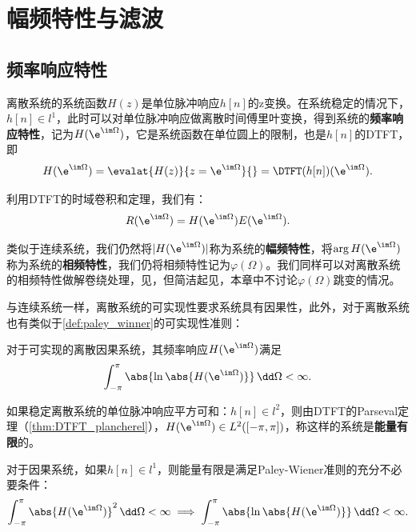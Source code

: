 \section{幅频特性与滤波}\label{sec:Magnitude_and_Filter}

\subsection{频率响应特性}\label{sub:discrete_system_freq_response}

离散系统的系统函数$H(z)$是单位脉冲响应$h[n]$的z变换。在系统稳定的情况下，$h[n]\in l^1$，此时可以对单位脉冲响应做离散时间傅里叶变换，得到系统的\textbf{频率响应特性}，记为$H(\e^{\im\Omega})$，它是系统函数在单位圆上的限制，也是$h[n]$的DTFT，即
\begin{equation}
    H(\e^{\im\Omega})=\evalat{H(z)}{z=\e^{\im\Omega}}{}=\DTFT(h[n])(\e^{\im\Omega}).
\end{equation}

利用DTFT的时域卷积和定理，我们有：
\begin{equation}
    R(\e^{\im\Omega})=H(\e^{\im\Omega})E(\e^{\im\Omega}).
\end{equation}

类似于连续系统，我们仍然将$|H(\e^{\im\Omega})|$称为系统的\textbf{幅频特性}，将$\arg H(\e^{\im\Omega})$称为系统的\textbf{相频特性}，我们仍将相频特性记为$\varphi(\Omega)$。我们同样可以对离散系统的相频特性做解卷绕处理，见，但简洁起见，本章中不讨论$\varphi(\Omega)$跳变的情况。

与连续系统一样，离散系统的可实现性要求系统具有因果性，此外，对于离散系统也有类似于\cref{def:paley_winner}的可实现性准则：

\begin{definition}
    对于可实现的离散因果系统，其频率响应$H(\e^{\im\Omega})$满足
    \begin{equation}
        \int_{-\pi}^{\pi}\abs{\ln\abs{H(\e^{\im\Omega})}}\,\dd\Omega<\infty.
    \end{equation}
\end{definition}

\begin{definition}[离散能量有限系统]
    如果稳定离散系统的单位脉冲响应平方可和：$h[n]\in l^2$，则由DTFT的Parseval定理（\cref{thm:DTFT_plancherel}），$H(\e^{\im\Omega})\in L^2([-\pi,\pi])$，称这样的系统是\textbf{能量有限}的。
\end{definition}

\begin{claim}
    对于因果系统，如果$h[n]\in l^1$，则能量有限是满足Paley-Wiener准则的充分不必要条件：
    \begin{equation}
        \int_{-\pi}^{\pi}\abs{H(\e^{\im\Omega})}^2\,\dd\Omega<\infty\implies\int_{-\pi}^{\pi}\abs{\ln\abs{H(\e^{\im\Omega})}}\,\dd\Omega<\infty.
    \end{equation}
\end{claim}

